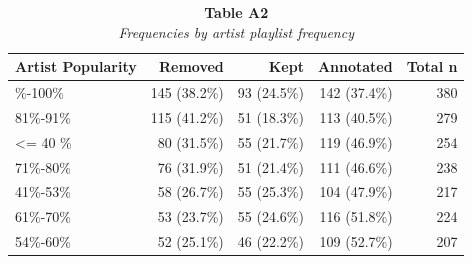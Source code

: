 \begin{table}
\caption*{
{\large \textbf{Table A2}} \\ 
{\small \emph{Frequencies by artist playlist frequency}}
} 
\fontsize{12.0pt}{14.4pt}\selectfont
\begin{tabular*}{\linewidth}{@{\extracolsep{\fill}}lrrrr}
\toprule
{Artist Popularity} & Removed & Kept & Annotated & Total n \\ 
\midrule\addlinespace[2.5pt]
91\%-100\% & 145 (38.2\%) & 93 (24.5\%) & 142 (37.4\%) & 380 \\ 
81\%-91\% & 115 (41.2\%) & 51 (18.3\%) & 113 (40.5\%) & 279 \\ 
<= 40 \% & 80 (31.5\%) & 55 (21.7\%) & 119 (46.9\%) & 254 \\ 
71\%-80\% & 76 (31.9\%) & 51 (21.4\%) & 111 (46.6\%) & 238 \\ 
41\%-53\% & 58 (26.7\%) & 55 (25.3\%) & 104 (47.9\%) & 217 \\ 
61\%-70\% & 53 (23.7\%) & 55 (24.6\%) & 116 (51.8\%) & 224 \\ 
54\%-60\% & 52 (25.1\%) & 46 (22.2\%) & 109 (52.7\%) & 207 \\ 
\bottomrule
\end{tabular*}
\end{table}

